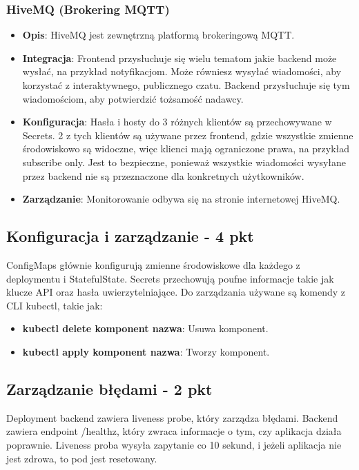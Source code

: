 \documentclass[12pt,a4paper]{article}
\begin{document}
\subsubsection{HiveMQ (Brokering MQTT)}
\begin{itemize}
    \item \textbf{Opis}: HiveMQ jest zewnętrzną platformą brokeringową MQTT.
    \item \textbf{Integracja}: Frontend przysłuchuje się wielu tematom jakie backend może wysłać, na przykład notyfikacjom. Może równiesz wysyłać wiadomości, aby korzystać z interaktywnego, publicznego czatu. Backend przysłuchuje się tym wiadomościom, aby potwierdzić tożsamość nadawcy.
    \item \textbf{Konfiguracja}: Hasła i hosty do 3 różnych klientów są przechowywane w Secrets. 2 z tych klientów są używane przez frontend, gdzie wszystkie zmienne środowiskowo są widoczne, więc klienci mają ograniczone prawa, na przykład subscribe only. Jest to bezpieczne, ponieważ wszystkie wiadomości wysyłane przez backend nie są przeznaczone dla konkretnych użytkowników.
    \item \textbf{Zarządzanie}: Monitorowanie odbywa się na stronie internetowej HiveMQ.
\end{itemize}

\subsection{Konfiguracja i zarządzanie - 4 pkt}
\label{sec:NonFunctionalConditions}

ConfigMaps głównie konfigurują zmienne środowiskowe dla każdego z deploymentu i StatefulState. Secrets przechowują poufne informacje takie jak klucze API oraz hasła uwierzytelniające. Do zarządzania używane są komendy z CLI kubectl, takie jak:

\begin{itemize}
    \item \textbf{kubectl delete {komponent} {nazwa}}: Usuwa komponent.
    \item \textbf{kubectl apply {komponent} {nazwa}}: Tworzy komponent.
\end{itemize}

\subsection{Zarządzanie błędami - 2 pkt}
\label{sec:ERD} 

Deployment backend zawiera liveness probe, który zarządza błędami. Backend zawiera endpoint /healthz, który zwraca informacje o tym, czy aplikacja działa poprawnie. Liveness proba wysyła zapytanie co 10 sekund, i jeżeli aplikacja nie jest zdrowa, to pod jest resetowany.
\end{document}
